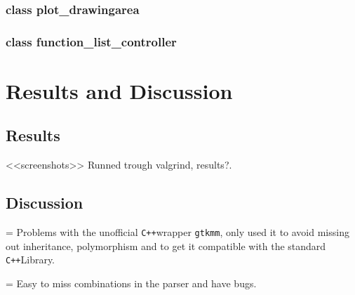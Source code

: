 \documentclass[a4paper,11pt]{kth-mag}
\newcommand{\Cpp}{\texttt{C++}}
\newcommand{\Gtkmm}{\texttt{gtkmm}}
\begin{document}
\subsection{class plot\_drawingarea}
\subsection{class function\_list\_controller}



\chapter{Results and Discussion}

\section{Results}
<<screenshots>>
Runned trough valgrind, results?.

\section{Discussion}
 = Problems with the unofficial \Cpp wrapper \Gtkmm, only used it to avoid missing out inheritance, polymorphism and to get it compatible with the standard \Cpp Library. 
 
 = Easy to miss combinations in the parser and have bugs.
\end{document}
